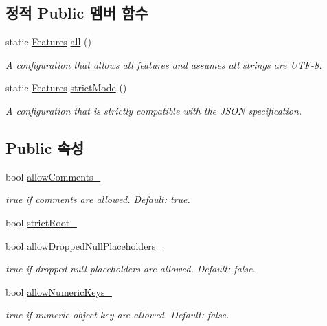 \subsection*{정적 Public 멤버 함수}
\begin{DoxyCompactItemize}
\item 
static \hyperlink{class_json_1_1_features}{Features} \hyperlink{class_json_1_1_features_a63894da6e2c100b38741fa933f3d33ae}{all} ()
\begin{DoxyCompactList}\small\item\em A configuration that allows all features and assumes all strings are U\+T\+F-\/8. \end{DoxyCompactList}\item 
static \hyperlink{class_json_1_1_features}{Features} \hyperlink{class_json_1_1_features_ae23176c14b2e79e81fb61fb1a8ab58ee}{strict\+Mode} ()
\begin{DoxyCompactList}\small\item\em A configuration that is strictly compatible with the J\+S\+ON specification. \end{DoxyCompactList}\end{DoxyCompactItemize}
\subsection*{Public 속성}
\begin{DoxyCompactItemize}
\item 
bool \hyperlink{class_json_1_1_features_a33afd389719624b6bdb23950b3c346c9}{allow\+Comments\+\_\+}
\begin{DoxyCompactList}\small\item\em {\ttfamily true} if comments are allowed. Default\+: {\ttfamily true}. \end{DoxyCompactList}\item 
bool \hyperlink{class_json_1_1_features_a1162c37a1458adc32582b585b552f9c3}{strict\+Root\+\_\+}
\item 
bool \hyperlink{class_json_1_1_features_a5076aa72c05c7596ac339ede36c97a6a}{allow\+Dropped\+Null\+Placeholders\+\_\+}
\begin{DoxyCompactList}\small\item\em {\ttfamily true} if dropped null placeholders are allowed. Default\+: {\ttfamily false}. \end{DoxyCompactList}\item 
bool \hyperlink{class_json_1_1_features_aff3cb16b79d15d3d761b11a0dd6d4d6b}{allow\+Numeric\+Keys\+\_\+}
\begin{DoxyCompactList}\small\item\em {\ttfamily true} if numeric object key are allowed. Default\+: {\ttfamily false}. \end{DoxyCompactList}\end{DoxyCompactItemize}


